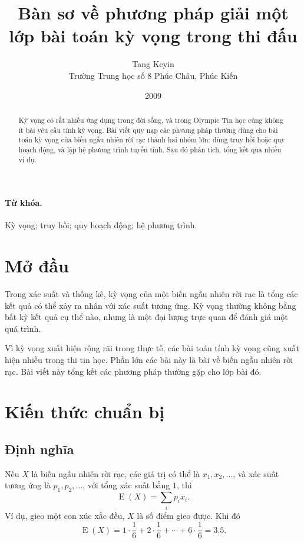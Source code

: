 \documentclass[11pt]{article}
\title{Bàn sơ về phương pháp giải một lớp bài toán kỳ vọng trong thi đấu}
\author{Tang Keyin\\Trường Trung học số 8 Phúc Châu, Phúc Kiến}
\date{2009}
\newcommand{\E}{\operatorname{E}}
\begin{document}
\maketitle


\begin{abstract}
Kỳ vọng có rất nhiều ứng dụng trong đời sống, và trong Olympic Tin học cũng
không ít bài yêu cầu tính kỳ vọng. Bài viết quy nạp các phương pháp thường
dùng cho bài toán kỳ vọng của biến ngẫu nhiên rời rạc thành hai nhóm lớn:
dùng truy hồi hoặc quy hoạch động, và lập hệ phương trình tuyến tính. Sau đó
phân tích, tổng kết qua nhiều ví dụ.
\end{abstract}

\paragraph{Từ khóa.}
Kỳ vọng; truy hồi; quy hoạch động; hệ phương trình.

\section{Mở đầu}

Trong xác suất và thống kê, kỳ vọng của một biến ngẫu nhiên rời rạc là tổng
các kết quả có thể xảy ra nhân với xác suất tương ứng. Kỳ vọng thường không
bằng bất kỳ kết quả cụ thể nào, nhưng là một đại lượng trực quan để đánh giá
một quá trình.

Vì kỳ vọng xuất hiện rộng rãi trong thực tế, các bài toán tính kỳ vọng cũng
xuất hiện nhiều trong thi tin học. Phần lớn các bài này là bài về biến ngẫu
nhiên rời rạc. Bài viết này tổng kết các phương pháp thường gặp cho lớp bài
đó.

\section{Kiến thức chuẩn bị}

\subsection{Định nghĩa}

Nếu \(X\) là biến ngẫu nhiên rời rạc, các giá trị có thể là
\(x_1,x_2,\ldots\), và xác suất tương ứng là \(p_1,p_2,\ldots\), với tổng xác
suất bằng \(1\), thì
\[
  \E(X)=\sum_i p_i x_i.
\]
Ví dụ, gieo một con xúc xắc đều, \(X\) là số điểm gieo được. Khi đó
\[
  \E(X)=1\cdot\frac16+2\cdot\frac16+\cdots+6\cdot\frac16=3.5.
\]
\end{document}
